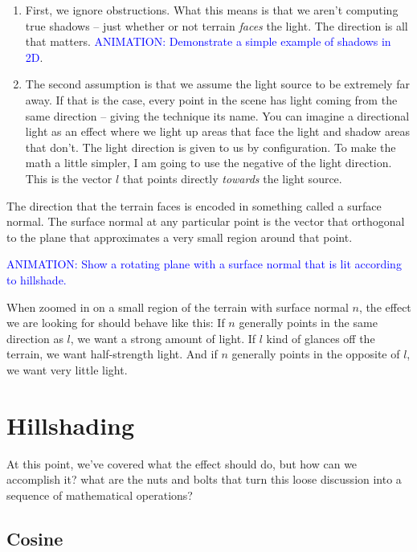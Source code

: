 \documentclass{article}
\newcommand\animation[1]{\textcolor{blue}{ANIMATION: #1}}
\begin{document}
\begin{enumerate}
	
\item First, we ignore obstructions.
What this means is that we aren't computing true shadows -- just whether or not terrain \textit{faces} the light.
The direction is all that matters.
\animation{Demonstrate a simple example of shadows in 2D}.
	
\item The second assumption is that we assume the light source to be extremely far away.
If that is the case, every point in the scene has light coming from the same direction -- giving the technique its name.
You can imagine a directional light as an effect where we light up areas that face the light and shadow areas that don't.
The light direction is given to us by configuration.
To make the math a little simpler, I am going to use the negative of the light direction.
This is the vector $l$ that points directly \textit{towards} the light source.

\end{enumerate}

The direction that the terrain faces is encoded in something called a surface normal.
The surface normal at any particular point is the vector that orthogonal to the plane that approximates a very small region around that point.

\animation{Show a rotating plane with a surface normal that is lit according to hillshade.}

When zoomed in on a small region of the terrain with surface normal $n$, the effect we are looking for should behave like this:
If $n$ generally points in the same direction as $l$, we want a strong amount of light.
If $l$ kind of glances off the terrain, we want half-strength light.
And if $n$ generally points in the opposite of $l$, we want very little light.

\section{Hillshading}

At this point, we've covered what the effect should do, but how can we accomplish it?
what are the nuts and bolts that turn this loose discussion into a sequence of mathematical operations?

\subsection{Cosine}
\end{document}
